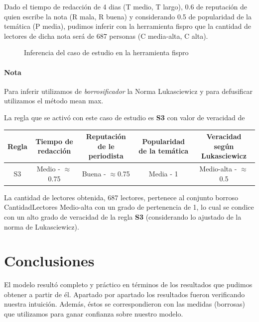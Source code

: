 \documentclass{article}
\begin{document}
Dado el tiempo de redacción de 4 dias (T medio, T largo), 0.6 de reputación de quien escribe la nota (R mala, R buena) y considerando 0.5 de popularidad de la temática (P media), pudimos inferir con la herramienta fispro que la cantidad de lectores de dicha nota será de 687 personas (C media-alta, C alta).

\begin{figure}[H]
	\centering
	\caption{Inferencia del caso de estudio en la herramienta fispro}
\end{figure}

\paragraph{Nota} Para inferir utilizamos de \textit{borrosificador} la Norma Lukasciewicz
y para defusificar utilizamos el método mean max.

\vspace{3mm}
La regla que se activó con este caso de estudio es \textbf{S3} con valor de veracidad de

\begin{table}[H]
	\centering
	\begin{tabular}{c|c c c|c}
		Regla&Tiempo de redacción&Reputación de le periodista&Popularidad de la temática&Veracidad según Lukasciewicz\\
		\hline
		S3&Medio - $\approx$0.75&Buena - $\approx$0.75&Media - 1&Medio-alta - $\approx$0.5\footnotemark\\
	\end{tabular}
\end{table}


La cantidad de lectores obtenida, 687 lectores, pertenece al conjunto borroso CantidadLectores Medio-alta con un grado de pertenencia de 1, lo cual se condice con un alto grado de veracidad de la regla \textbf{S3} (considerando lo ajustado de la norma de Lukasciewicz).

\pagebreak
\section*{Conclusiones}

El modelo resultó completo y práctico en términos de los resultados que pudimos obtener a partir de él. Apartado por apartado los resultados fueron verificando nuestra intuición. Además, éstos se correspondieron con las medidas (borrosas) que utilizamos para ganar confianza sobre nuestro modelo.
\end{document}
